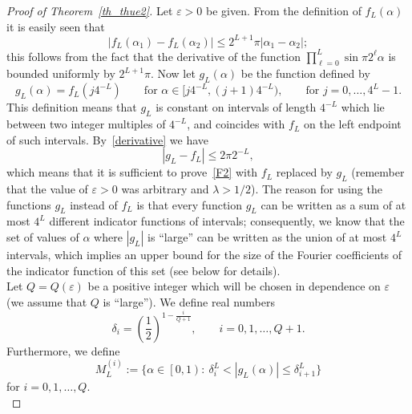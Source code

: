 \documentclass[12pt]{amsart}
\newcommand {\ve} {\varepsilon}
\begin{document}
\begin{proof}[Proof of Theorem~\ref{th_thue2}]
Let $\ve > 0$ be given. From the definition of $f_L(\alpha)$ it is easily seen that
\begin{equation} \label{derivative}
\left|f_L(\alpha_1) - f_L(\alpha_2)\right| \leq 2^{L+1} \pi |\alpha_1 - \alpha_2|;
\end{equation}
this follows from the fact that the derivative of the function $\prod^{L}_{\ell=0} \sin \pi 2^{\ell} \alpha$ is bounded uniformly by $2^{L+1} \pi$. Now let $g_L(\alpha)$ be the function defined by
$$
g_L(\alpha) = f_L(j 4^{-L}) \qquad \textrm{for $\alpha \in \Big[j 4^{-L}, (j+1) 4^{-L}\Big)$}, \qquad \textrm{for $j=0, \dots, 4^L - 1$}. 
$$
This definition means that $g_L$ is constant on intervals of length $4^{-L}$ which lie between two integer multiples of $4^{-L}$, and coincides with $f_L$ on the left endpoint of such intervals. By~\eqref{derivative} we have
\begin{equation} \label{gf}
\left|g_L - f_L\right| \leq 2 \pi 2^{-L},
\end{equation}
which means that it is sufficient to prove~\eqref{F2} with $f_L$ replaced by $g_L$ (remember that the value of $\ve>0$ was arbitrary and $\lambda>1/2$). The reason for using the functions $g_L$ instead of $f_L$ is that every function $g_L$ can be written as a sum of at most $4^L$ different indicator functions of intervals; consequently, we know that the set of values of $\alpha$ where $|g_L|$ is ``large'' can be written as the union of at most $4^L$ intervals, which implies an upper bound for the size of the Fourier coefficients of the indicator function of this set (see below for details).\\

Let $Q=Q\left(\ve\right)$ be a positive integer which will be chosen in dependence on $\ve$ (we assume that $Q$ is ``large''). We define real numbers
$$
\delta_{i} = \left(\frac{1}{2}\right)^{1-\frac{i}{Q+1}}, \qquad i = 0, 1, \dots, Q+1.
$$
Furthermore, we define 
$$
M^{\left(i\right)}_{L} := \Big\{\alpha \in \left[0,1\right):~ \delta_{i}^{L} < |g_{L} \left(\alpha \right)| \leq \delta^{L}_{i+1}\Big\}
$$ 
for $i=0,1,\ldots, Q$.\\ 


\end{proof}
\end{document}
